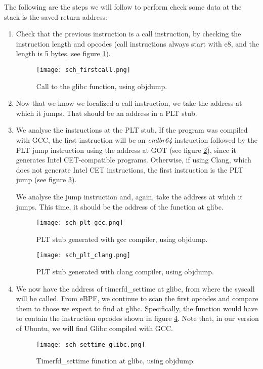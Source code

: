The following are the steps we will follow to perform check some data at the stack is the saved return address:
\begin{enumerate}
\item Check that the previous instruction is a call instruction, by checking the instruction length and opcodes (call instructions always start with e8, and the length is 5 bytes, see figure \ref{fig:firstcall}).
\begin{figure}[htbp]
	\centering
	\texttt{[image: sch\_firstcall.png]}
	\caption{Call to the glibc function, using objdump.}
	\label{fig:firstcall}
\end{figure}
\item Now that we know we localized a call instruction, we take the address at which it jumps. That should be an address in a PLT stub.
\item We analyse the instructions at the PLT stub. If the program was compiled with GCC, the first instruction will be an \textit{endbr64} instruction followed by the PLT jump instruction using the address at GOT (see figure \ref{fig:plt_gcc}), since it generates Intel CET-compatible programs. Otherwise, if using Clang, which does not generate Intel CET instructions, the first instruction is the PLT jump (see figure \ref{fig:plt_clang}).

We analyse the jump instruction and, again, take the address at which it jumps. This time, it should be the address of the function at glibc.
\begin{figure}[htbp]
	\centering
	\texttt{[image: sch\_plt\_gcc.png]}
	\caption{PLT stub generated with gcc compiler, using objdump.}
	\label{fig:plt_gcc}
\end{figure}
\begin{figure}[htbp]
	\centering
	\texttt{[image: sch\_plt\_clang.png]}
	\caption{PLT stub generated with clang compiler, using objdump.}
	\label{fig:plt_clang}
\end{figure}

\item We now have the address of timerfd\_settime at glibc, from where the syscall will be called. From eBPF, we continue to scan the first opcodes and compare them to those we expect to find at glibc. Specifically, the function would have to contain the instruction opcodes shown in figure \ref{fig:settime_glibc}. Note that, in our version of Ubuntu, we will find Glibc compiled with GCC.

\begin{figure}[htbp]
	\centering
	\texttt{[image: sch\_settime\_glibc.png]}
	\caption{Timerfd\_settime function at glibc, using objdump.}
	\label{fig:settime_glibc}
\end{figure}

\end{enumerate}

